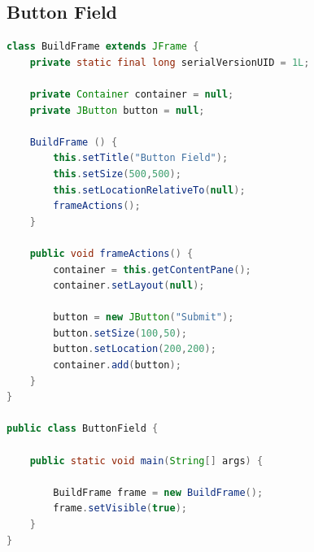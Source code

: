 \subsection{Button Field}

\begin{frame}

\begin{lstlisting}[language=java]
class BuildFrame extends JFrame {
	private static final long serialVersionUID = 1L;
	
	private Container container = null;
	private JButton button = null;
	
	BuildFrame () {
		this.setTitle("Button Field");
		this.setSize(500,500);
		this.setLocationRelativeTo(null);
		frameActions();
	}
	
	public void frameActions() {
		container = this.getContentPane();
		container.setLayout(null);
		
		button = new JButton("Submit");
		button.setSize(100,50);
		button.setLocation(200,200);
		container.add(button);
	}
}

public class ButtonField {

	public static void main(String[] args) {
		
		BuildFrame frame = new BuildFrame();
		frame.setVisible(true);
	}
}
\end{lstlisting}


\end{frame}



